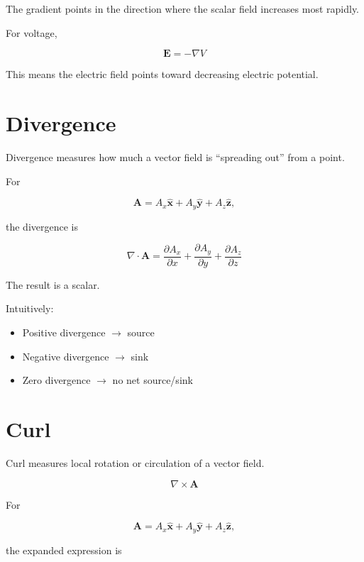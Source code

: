 \documentclass[11pt]{article}
\newcommand{\vect}[1]{\mathbf{#1}}
\newcommand{\uvect}[1]{\hat{\mathbf{#1}}}
\begin{document}
The gradient points in the direction where the scalar field increases most rapidly.

For voltage,

\[
\boxed{
\vect{E}=-\nabla V
}
\]

This means the electric field points toward decreasing electric potential.



\section{Divergence}

Divergence measures how much a vector field is ``spreading out'' from a point.

For

\[
\vect{A}
=
A_x\uvect{x}
+
A_y\uvect{y}
+
A_z\uvect{z},
\]

the divergence is

\[
\boxed{
\nabla\cdot\vect{A}
=
\frac{\partial A_x}{\partial x}
+
\frac{\partial A_y}{\partial y}
+
\frac{\partial A_z}{\partial z}
}
\]

The result is a scalar.

Intuitively:

\begin{itemize}
    \item Positive divergence $\rightarrow$ source
    \item Negative divergence $\rightarrow$ sink
    \item Zero divergence $\rightarrow$ no net source/sink
\end{itemize}



\section{Curl}

Curl measures local rotation or circulation of a vector field.

\[
\boxed{
\nabla\times\vect{A}
}
\]

For

\[
\vect{A}
=
A_x\uvect{x}
+
A_y\uvect{y}
+
A_z\uvect{z},
\]

the expanded expression is
\end{document}
